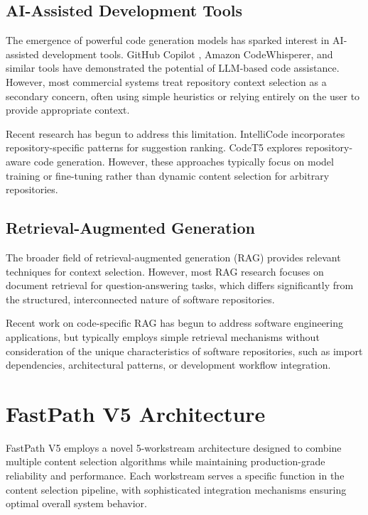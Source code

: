 \documentclass[conference]{IEEEtran}
\begin{document}
\subsection{AI-Assisted Development Tools}

The emergence of powerful code generation models has sparked interest in AI-assisted development tools. GitHub Copilot \cite{chen2021evaluating}, Amazon CodeWhisperer, and similar tools have demonstrated the potential of LLM-based code assistance. However, most commercial systems treat repository context selection as a secondary concern, often using simple heuristics or relying entirely on the user to provide appropriate context.

Recent research has begun to address this limitation. IntelliCode \cite{svyatkovskiy2019intellicode} incorporates repository-specific patterns for suggestion ranking. CodeT5 \cite{wang2021codet5} explores repository-aware code generation. However, these approaches typically focus on model training or fine-tuning rather than dynamic content selection for arbitrary repositories.

\subsection{Retrieval-Augmented Generation}

The broader field of retrieval-augmented generation (RAG) \cite{lewis2020retrieval} provides relevant techniques for context selection. However, most RAG research focuses on document retrieval for question-answering tasks, which differs significantly from the structured, interconnected nature of software repositories.

Recent work on code-specific RAG \cite{zhou2023docprompting} has begun to address software engineering applications, but typically employs simple retrieval mechanisms without consideration of the unique characteristics of software repositories, such as import dependencies, architectural patterns, or development workflow integration.

\section{FastPath V5 Architecture}

FastPath V5 employs a novel 5-workstream architecture designed to combine multiple content selection algorithms while maintaining production-grade reliability and performance. Each workstream serves a specific function in the content selection pipeline, with sophisticated integration mechanisms ensuring optimal overall system behavior.
\end{document}
